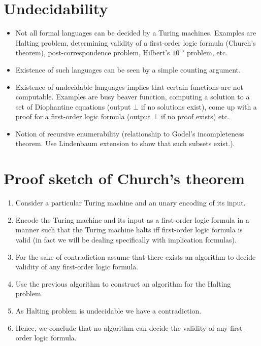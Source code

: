 \documentclass[
11pt,notheorems,hyperref={pdfauthor=whatever}
]{beamer}
\begin{document}
\section{Undecidability}
\begin{frame}
\begin{itemize}
    \item Not all formal languages can be decided by a Turing machines. Examples are Halting problem, determining validity of a first-order logic formula (Church's theorem), post-correspondence problem, Hilbert's $10^{\text{th}}$ problem, etc.
    \item Existence of such languages can be seen by a simple counting argument.
    \item Existence of undecidable languages implies that certain functions are not computable. Examples are busy beaver function, computing a solution to a set of Diophantine equations (output $\bot$ if no solutions exist), come up with a proof for a first-order logic formula (output $\bot$ if no proof exists) etc.
    \item Notion of recursive enumerability (relationship to Godel's incompleteness theorem. Use Lindenbaum extension to show that such subsets exist.).
\end{itemize}     
\end{frame}

\section{Proof sketch of Church's theorem}
\begin{frame}
    \begin{enumerate}
        \item Consider a particular Turing machine and an unary encoding of its input.
        \item Encode the Turing machine and its input as a first-order logic formula in a manner such that the Turing machine halts iff first-order logic formula is valid (in fact we will be dealing specifically with implication formulas).
        \item For the sake of contradiction assume that there exists an algorithm to decide validity of any first-order logic formula.
        \item Use the previous algorithm to construct an algorithm for the Halting problem.
        \item As Halting problem is undecidable we have a contradiction.
        \item Hence, we conclude that no algorithm can decide the validity of any first-order logic formula.
    \end{enumerate}
\end{frame}
\end{document}
